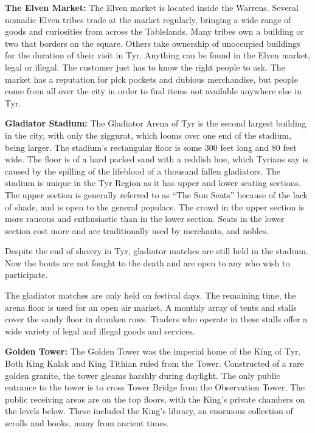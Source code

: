 {
	\textbf{The Elven Market:} The Elven market is located inside the Warrens. Several nomadic Elven tribes trade at the market regularly, bringing a wide range of goods and curiosities from across the Tablelands. Many tribes own a building or two that borders on the square. Others take ownership of unoccupied buildings for the duration of their visit in Tyr. Anything can be found in the Elven market, legal or illegal. The customer just has to know the right people to ask. The market has a reputation for pick pockets and dubious merchandise, but people come from all over the city in order to find items not available anywhere else in Tyr.

	\textbf{Gladiator Stadium:} The Gladiator Arena of Tyr is the second largest building in the city, with only the ziggurat, which looms over one end of the stadium, being larger. The stadium’s rectangular floor is some 300 feet long and 80 feet wide. The floor is of a hard packed sand with a reddish hue, which Tyrians say is caused by the spilling of the lifeblood of a thousand fallen gladiators. The stadium is unique in the Tyr Region as it has upper and lower seating sections. The upper section is generally referred to as “The Sun Seats” because of the lack of shade, and is open to the general populace. The crowd in the upper section is more raucous and enthusiastic than in the lower section. Seats in the lower section cost more and are traditionally used by merchants, and nobles.

	Despite the end of slavery in Tyr, gladiator matches are still held in the stadium. Now the bouts are not fought to the death and are open to any who wish to participate.

	The gladiator matches are only held on festival days. The remaining time, the arena floor is used for an open air market. A monthly array of tents and stalls cover the sandy floor in drunken rows. Traders who operate in these stalls offer a wide variety of legal and illegal goods and services.

	\textbf{Golden Tower:} The Golden Tower was the imperial home of the King of Tyr. Both King Kalak and King Tithian ruled from the Tower. Constructed of a rare golden granite, the tower gleams harshly during daylight. The only public entrance to the tower is to cross Tower Bridge from the Observation Tower. The public receiving areas are on the top floors, with the King’s private chambers on the levels below. These included the King’s library, an enormous collection of scrolls and books, many from ancient times.

}
